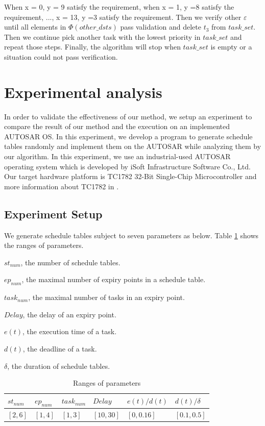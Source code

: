 \documentclass[10pt,conference]{IEEEtran}
\begin{document}
When x = 0, y = 9 satisfy the requirement, when x = 1, y =8 satisfy the requirement, ..., x = 13, y =3 satisfy the requirement. Then we verify other $\varepsilon$ until all elements in $\Phi(other\_dsts)$ pass validation and delete $t_3$ from $task\_set$. Then we continue pick another task with the lowest priority in $task\_set$ and repeat those steps. Finally, the algorithm will stop when $task\_set$ is empty or a situation could not pass verification.


\section{Experimental analysis}
In order to validate the effectiveness of our method, we setup an experiment to compare the result of our method and the execution on an implemented AUTOSAR OS. In this experiment, we develop a program to generate schedule tables randomly and implement them on the AUTOSAR while analyzing them by our algorithm. In this experiment, we use an industrial-used AUTOSAR operating system which is developed by iSoft Infrastructure Software Co., Ltd. Our target hardware platform is TC1782 32-Bit Single-Chip Microcontroller and more information about TC1782 in \cite{infineon.org}. 
\subsection{Experiment Setup}
We generate schedule tables subject to seven parameters as below. Table \ref{range} shows the ranges of parameters. 

\begin{compactitem}
  \item $st_{num}$, the number of schedule tables.
  \item $ep_{num}$, the maximal number of expiry points in a schedule table.
  \item $task_{num}$, the maximal number of tasks in an expiry point.
  \item $Delay$, the delay of an expiry point.
  \item $e(t)$, the execution time of a task.
  \item $d(t)$, the deadline of a task.
  \item $\delta$, the duration of schedule tables.
\end{compactitem}
\begin{table}[htbp]
  \centering
  \begin{tabular}{llllll}
    \toprule
    $st_{num}$ & $ep_{num}$ & $task_{num}$ & $Delay$ & $e(t)/d(t)$ & $d(t)/\delta$\\
    \midrule
    $[2,6]$&$[1,4]$&$[1,3]$&$[10,30]$&$[0,0.16]$&$[0.1,0.5]$\\
    \bottomrule
  \end{tabular}
  \caption{Ranges of parameters}\label{range}
\end{table}
\end{document}
